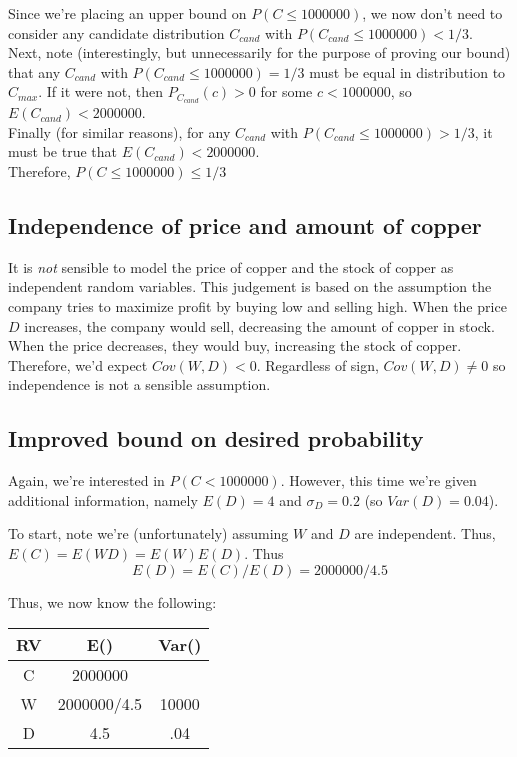 \documentclass[paper=a4, fontsize=11pt]{scrartcl} %
\numberwithin{equation}{section} %
\numberwithin{figure}{section} %
\numberwithin{table}{section} %
\begin{document}
Since we're placing an upper bound on $P(C \leq 1000000)$, we now don't need to consider any candidate distribution $C_{cand}$ with $P(C_{cand} \leq 1000000) < 1/3$.\\

Next, note (interestingly, but unnecessarily for the purpose of proving our bound) that any $C_{cand}$ with $P(C_{cand} \leq 1000000) = 1/3$ must be equal in distribution to $C_{max}$. If it were not, then $P_{C_{cand}}(c) > 0$ for some $c < 1000000$, so $E(C_{cand}) < 2000000$.\\

Finally (for similar reasons), for any $C_{cand}$ with $P(C_{cand} \leq 1000000) > 1/3$, it must be true that $E(C_{cand}) < 2000000$.\\

Therefore, $P(C \leq 1000000) \leq 1/3$

\subsection{Independence of price and amount of copper}

It is \textit{not} sensible to model the price of copper and the stock of copper as independent random variables. This judgement is based on the assumption the company tries to maximize profit by buying low and selling high. When the price $D$ increases, the company would sell, decreasing the amount of copper in stock. When the price decreases, they would buy, increasing the stock of copper. Therefore, we'd expect $Cov(W,D) < 0$. Regardless of sign, $Cov(W,D) \neq 0$ so independence is not a sensible assumption.

\subsection{Improved bound on desired probability}

Again, we're interested in $P(C  < 1000000)$. However, this time we're given additional information, namely $E(D) = 4$ and $\sigma_D = 0.2$ (so $Var(D) = 0.04$).

To start, note we're (unfortunately) assuming $W$ and $D$ are independent. Thus, $E(C) = E(WD) = E(W)E(D)$. Thus
\begin{equation*}
E(D) = E(C)/E(D) = 2000000/4.5
\end{equation*}

Thus, we now know the following:

\begin{center}
  \begin{tabular}{ | c | c | c | }
    \hline
    RV & E() & Var() \\ \hline
    C & 2000000 &  \\ \hline
    W & 2000000/4.5 & 10000 \\ \hline
    D & 4.5 & .04 \\ \hline
  \end{tabular}
\end{center}
\end{document}
